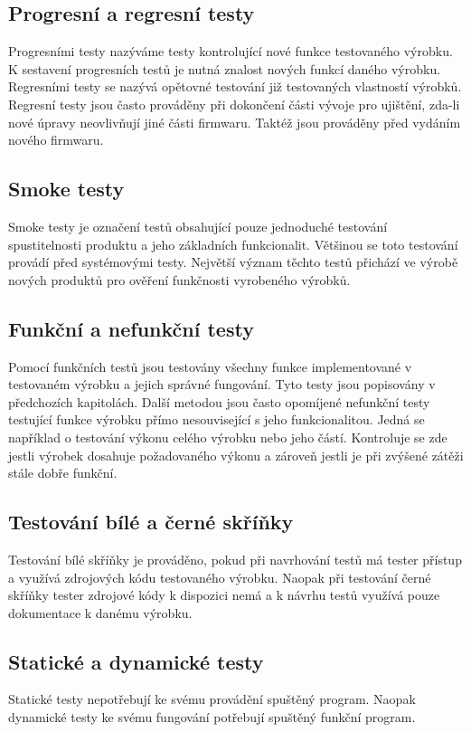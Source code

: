 \subsection{Progresní a regresní testy}
Progresními testy nazýváme testy kontrolující nové funkce testovaného výrobku. K sestavení progresních testů je nutná znalost nových funkcí daného výrobku. Regresními testy se nazývá opětovné testování již testovaných vlastností výrobků. Regresní testy jsou často prováděny při dokončení části vývoje pro ujištění, zda-li nové úpravy neovlivňují jiné části firmwaru. Taktéž jsou prováděny před vydáním nového firmwaru.

\subsection{Smoke testy}
Smoke testy je označení testů obsahující pouze jednoduché testování spustitelnosti produktu a jeho základních funkcionalit. Většinou se toto testování provádí před systémovými testy. Největší význam těchto testů přichází ve výrobě nových produktů pro ověření funkčnosti vyrobeného výrobků.

\subsection{Funkční a nefunkční testy}
Pomocí funkčních testů jsou testovány všechny funkce implementované v testovaném výrobku a jejich správné fungování. Tyto testy jsou popisovány v předchozích kapitolách. Další metodou jsou často opomíjené nefunkční testy testující funkce výrobku přímo nesouvisející s jeho funkcionalitou. Jedná se například o testování výkonu celého výrobku nebo jeho částí. Kontroluje se zde jestli výrobek dosahuje požadovaného výkonu a zároveň jestli je při zvýšené zátěži stále dobře funkční.

\subsection{Testování bílé a černé skříňky}
Testování bílé skříňky je prováděno, pokud při navrhování testů má tester přístup a využívá zdrojových kódu testovaného výrobku. Naopak při testování černé skříňky tester zdrojové kódy k dispozici nemá a k návrhu testů využívá pouze dokumentace k danému výrobku.

\subsection{Statické a dynamické testy}
Statické testy nepotřebují ke svému provádění spuštěný program. Naopak dynamické testy ke svému fungování potřebují spuštěný funkční program.

\endinput
